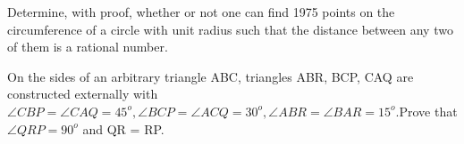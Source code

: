 \item Determine, with proof, whether or not one can find 1975 points on the circumference of a circle with unit radius such that the distance between any two of them is a rational number.
\item On the sides of an arbitrary triangle ABC, triangles ABR, BCP, CAQ are constructed externally with $\angle{CBP}=\angle{CAQ}=45^{o},\angle{BCP}=\angle{ACQ}=30^{o},\angle{ABR}=\angle{BAR}=15^{o}.$Prove that $\angle{QRP}=90^{o}$ and QR = RP.


